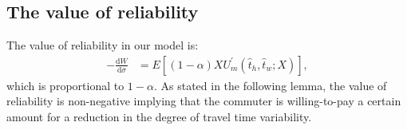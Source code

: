 \documentclass[12pt,a4paper,british]{article}
\begin{document}
%


\subsection*{The value of reliability}

The value of reliability in our model is:
\begin{align*}
-\frac{\mathrm{d}W}{\mathrm{d}\sigma} & = E\left[\left( 1 - \alpha \right) X U_{m}^{\prime} \left(\hat{t}_{h}, \hat{t}_{w}; X\right)\right],
\end{align*} %
which is proportional to $1-\alpha$. As stated in the following lemma, the value of reliability is non-negative implying that the commuter is willing-to-pay a certain amount for a reduction in the degree of travel time variability.
\end{document}
